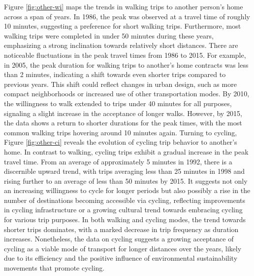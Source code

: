 \documentclass[12pt,twoside]{reedthesis}
\begin{document}
Figure \ref{fig:other-wi} maps the trends in walking trips to another person's home across a span of years. In 1986, the peak was observed at a travel time of roughly 10 minutes, suggesting a preference for short walking trips. Furthermore, most walking trips were completed in under 50 minutes during these years, emphasizing a strong inclination towards relatively short distances.
There are noticeable fluctuations in the peak travel times from 1986 to 2015. For example, in 2005, the peak duration for walking trips to another's home contracts was less than 2 minutes, indicating a shift towards even shorter trips compared to previous years. This shift could reflect changes in urban design, such as more compact neighborhoods or increased use of other transportation modes. By 2010, the willingness to walk extended to trips under 40 minutes for all purposes, signaling a slight increase in the acceptance of longer walks. However, by 2015, the data shows a return to shorter durations for the peak times, with the most common walking trips hovering around 10 minutes again. Turning to cycling, Figure \ref{fig:other-ci} reveals the evolution of cycling trip behavior to another's home. In contrast to walking, cycling trips exhibit a gradual increase in the peak travel time. From an average of approximately 5 minutes in 1992, there is a discernible upward trend, with trips averaging less than 25 minutes in 1998 and rising further to an average of less than 50 minutes by 2015. It suggests not only an increasing willingness to cycle for longer periods but also possibly a rise in the number of destinations becoming accessible via cycling, reflecting improvements in cycling infrastructure or a growing cultural trend towards embracing cycling for various trip purposes. In both walking and cycling modes, the trend towards shorter trips dominates, with a marked decrease in trip frequency as duration increases. Nonetheless, the data on cycling suggests a growing acceptance of cycling as a viable mode of transport for longer distances over the years, likely due to its efficiency and the positive influence of environmental sustainability movements that promote cycling.
\end{document}
